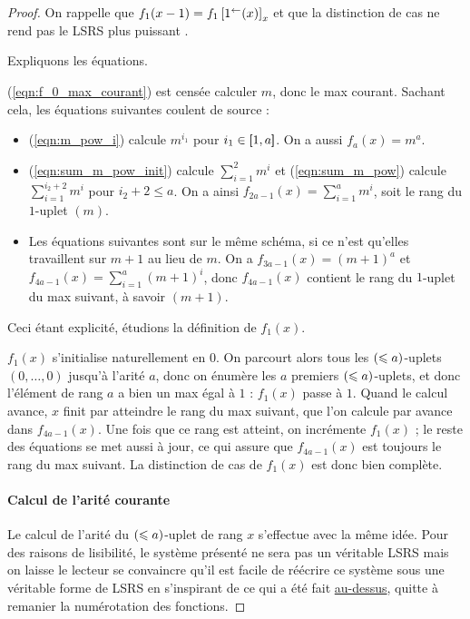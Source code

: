 \begin{proof}
			On rappelle que $f_1(x-1) = f_1\left[ 1^{\leftarrow}(x) \right]_{x}$ et que la distinction de cas ne rend pas le LSRS plus puissant \cite{GrandjeanSchwentick2002}. 
			
			Expliquons les équations.
			
			(\ref{eqn:f_0_max_courant}) est censée calculer $m$, donc le max courant. Sachant cela, les équations suivantes coulent de source : 
			
			\begin{itemize}
				\item 	(\ref{eqn:m_pow_i}) calcule $m^{i_1}$ pour $i_1 \in \left[\!\!\>\!\left[ 1 , a \right]\!\!\>\!\right]$. On a aussi $f_{a}(x) = m^a$. 
				
				\item 	(\ref{eqn:sum_m_pow_init}) calcule $\sum_{i = 1}^{2} m^i$ et (\ref{eqn:sum_m_pow}) calcule $\sum_{i = 1}^{i_2+2} m^i$ pour $i_2+2 \leqslant a$. On a ainsi $f_{2a-1}(x) = \sum_{i = 1}^{a} m^i$, soit le rang du $1$-uplet $(m)$.
				
				\item 	Les équations suivantes sont sur le même schéma, si ce n'est qu'elles travaillent sur $m+1$ au lieu de $m$. On a $f_{3a-1}(x) = (m+1)^a$ et $f_{4a-1}(x) = \sum_{i = 1}^{a} (m+1)^i$, donc $f_{4a-1}(x)$ contient le rang du $1$-uplet du max suivant, à savoir $(m+1)$. 
			\end{itemize}
			
			Ceci étant explicité, étudions la définition de $f_1(x)$. 
			
			$f_1(x)$ s'initialise naturellement en $0$. On parcourt alors tous les $\left( \leqslant a \right)$-uplets $(0, \dots, 0)$ jusqu'à l'arité $a$, donc on énumère les $a$ premiers $\left( \leqslant a \right)$-uplets, et donc l'élément de rang $a$ a bien un max égal à $1$ : $f_1(x)$ passe à $1$. Quand le calcul avance, $x$ finit par atteindre le rang du max suivant, que l'on calcule par avance dans $f_{4a-1}(x)$. Une fois que ce rang est atteint, on incrémente $f_1(x)$ ; le reste des équations se met aussi à jour, ce qui assure que $f_{4a-1}(x)$ est toujours le rang du max suivant. La distinction de cas de $f_1(x)$ est donc bien complète.
			
		\paragraph{Calcul de l'arité courante}
			\label{par:calcul_arite_courante}
			Le calcul de l'arité du $\left( \leqslant a \right)$-uplet de rang $x$ s'effectue avec la même idée. Pour des raisons de lisibilité, le système présenté ne sera pas un véritable LSRS mais on laisse le lecteur se convaincre qu'il est facile de réécrire ce système sous une véritable forme de LSRS en s'inspirant de ce qui a été fait \hyperref[par:calcul_max_bon_ordre]{au-dessus}, quitte à remanier la numérotation des fonctions. 
			

\end{proof}
